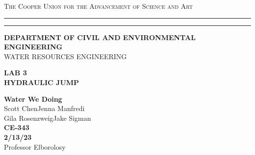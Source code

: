 \begin{titlepage}
    \begin{center}
    {{\Large{\textsc{The Cooper Union for the Advancement of Science and Art}}}} \rule[0.1cm]{15.8cm}{0.1mm}
    \rule[0.5cm]{15.8cm}{0.6mm}
    {\small{\bf DEPARTMENT OF CIVIL AND ENVIRONMENTAL ENGINEERING}}\\
    {\footnotesize{WATER RESOURCES ENGINEERING}}
    \end{center}
    \vspace{15mm}
    \begin{center}
    {\large{\bf LAB 3\\}}
    \vspace{5mm}
    {\Large{\bf HYDRAULIC JUMP}}
    \end{center}
    \vspace{35mm}
    \par
    \noindent
    \hfill
    \vspace{20mm}
    \begin{center}
    {\large{ {\bf Water We Doing} \\ { Scott Chen\hspace{5mm}Jenna Manfredi\\Gila Rosenzweig\hspace{5mm}Jake Sigman}}}
    \vspace{40mm}
    {\large {\bf \\CE-343 \\ 2/13/23 \\}}
    \vspace{15mm}
    {\normalsize{Professor Elborolosy}}
    \end{center}
\end{titlepage}